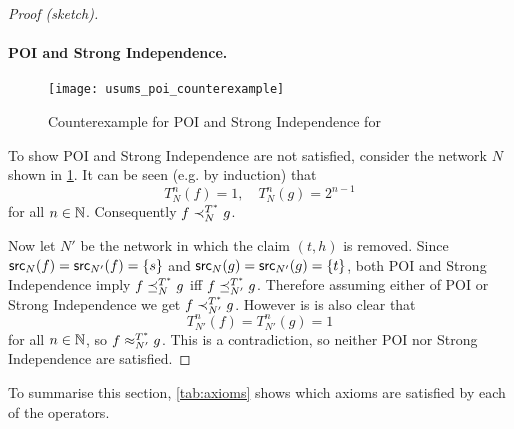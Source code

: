 \begin{proof}[Proof (sketch)]
\paragraph{POI and Strong Independence.}

\begin{figure}[ht]
\centering
\texttt{[image: usums\_poi\_counterexample]}
\caption{
    Counterexample for POI and Strong Independence for \usums{}
}
\label{td_fig_usums_poi_counterexample}
\end{figure}

To show POI and Strong Independence are not satisfied, consider the network $N$
shown in \cref{td_fig_usums_poi_counterexample}. It can be seen (e.g. by
induction) that
\[
    T_N^n(f) = 1,
    \quad
    T_N^n(g) = 2^{n-1}
\]
for all $n \in \mathbb{N}$. Consequently $f \prec_N^{T^*} g$.\footnotemark


Now let $N'$ be the network in which the claim $(t, h)$ is removed. Since
$\mathsf{src}_N(f) = \mathsf{src}_{N'}(f) = \{s\}$ and $\mathsf{src}_N(g) = \mathsf{src}_{N'}(g) = \{t\}$, both
POI and Strong Independence imply $f \preceq_N^{T^*} g$ iff $f \preceq_{N'}^{T^*} g$.
Therefore assuming either of POI or Strong Independence we get $f
\prec_{N'}^{T^*} g$. However is is also clear that
\[
    T_{N'}^n(f) = T_{N'}^n(g) = 1
\]
for all $n \in \mathbb{N}$, so $f \approx_{N'}^{T^*} g$. This is a contradiction, so
neither POI nor Strong Independence are satisfied.
\end{proof}

To summarise this section, \cref{tab:axioms} shows which axioms are
satisfied by each of the operators.

